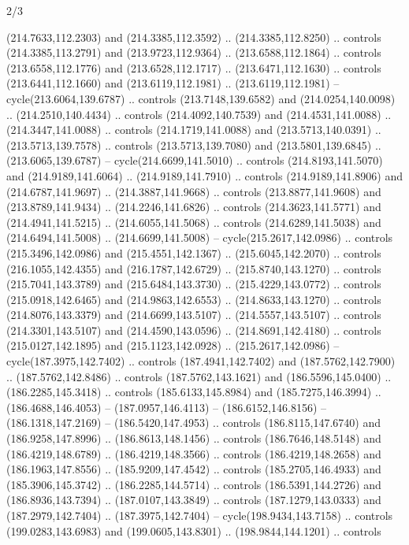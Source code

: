 \begin{flagdescription}{2/3}
\begin{scope}[xshift=0.5\flaglength,yshift=0.5\flagwidth,scale=\flagwidth/180]
\begin{scope}[y=0.8pt, x=0.8pt, yscale=-1,shift={(-168.75,-108.75)}]
  (214.7633,112.2303) and (214.3385,112.3592) .. (214.3385,112.8250) .. controls
  (214.3385,113.2791) and (213.9723,112.9364) .. (213.6588,112.1864) .. controls
  (213.6558,112.1776) and (213.6528,112.1717) .. (213.6471,112.1630) .. controls
  (213.6441,112.1660) and (213.6119,112.1981) .. (213.6119,112.1981) --
  cycle(213.6064,139.6787) .. controls (213.7148,139.6582) and
  (214.0254,140.0098) .. (214.2510,140.4434) .. controls (214.4092,140.7539) and
  (214.4531,141.0088) .. (214.3447,141.0088) .. controls (214.1719,141.0088) and
  (213.5713,140.0391) .. (213.5713,139.7578) .. controls (213.5713,139.7080) and
  (213.5801,139.6845) .. (213.6065,139.6787) -- cycle(214.6699,141.5010) ..
  controls (214.8193,141.5070) and (214.9189,141.6064) .. (214.9189,141.7910) ..
  controls (214.9189,141.8906) and (214.6787,141.9697) .. (214.3887,141.9668) ..
  controls (213.8877,141.9608) and (213.8789,141.9434) .. (214.2246,141.6826) ..
  controls (214.3623,141.5771) and (214.4941,141.5215) .. (214.6055,141.5068) ..
  controls (214.6289,141.5038) and (214.6494,141.5008) .. (214.6699,141.5008) --
  cycle(215.2617,142.0986) .. controls (215.3496,142.0986) and
  (215.4551,142.1367) .. (215.6045,142.2070) .. controls (216.1055,142.4355) and
  (216.1787,142.6729) .. (215.8740,143.1270) .. controls (215.7041,143.3789) and
  (215.6484,143.3730) .. (215.4229,143.0772) .. controls (215.0918,142.6465) and
  (214.9863,142.6553) .. (214.8633,143.1270) .. controls (214.8076,143.3379) and
  (214.6699,143.5107) .. (214.5557,143.5107) .. controls (214.3301,143.5107) and
  (214.4590,143.0596) .. (214.8691,142.4180) .. controls (215.0127,142.1895) and
  (215.1123,142.0928) .. (215.2617,142.0986) -- cycle(187.3975,142.7402) ..
  controls (187.4941,142.7402) and (187.5762,142.7900) .. (187.5762,142.8486) ..
  controls (187.5762,143.1621) and (186.5596,145.0400) .. (186.2285,145.3418) ..
  controls (185.6133,145.8984) and (185.7275,146.3994) .. (186.4688,146.4053) --
  (187.0957,146.4113) -- (186.6152,146.8156) -- (186.1318,147.2169) --
  (186.5420,147.4953) .. controls (186.8115,147.6740) and (186.9258,147.8996) ..
  (186.8613,148.1456) .. controls (186.7646,148.5148) and (186.4219,148.6789) ..
  (186.4219,148.3566) .. controls (186.4219,148.2658) and (186.1963,147.8556) ..
  (185.9209,147.4542) .. controls (185.2705,146.4933) and (185.3906,145.3742) ..
  (186.2285,144.5714) .. controls (186.5391,144.2726) and (186.8936,143.7394) ..
  (187.0107,143.3849) .. controls (187.1279,143.0333) and (187.2979,142.7404) ..
  (187.3975,142.7404) -- cycle(198.9434,143.7158) .. controls
  (199.0283,143.6983) and (199.0605,143.8301) .. (198.9844,144.1201) .. controls

\end{scope}
\end{scope}
\end{flagdescription}
